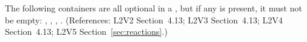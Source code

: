 The following containers are all optional in a \Reaction, but if any
is present, it must not be empty: ,
, , .
(References: L2V2 Section~4.13; L2V3 Section~4.13; L2V4 Section~4.13; L2V5 Section~\ref{sec:reactions}.)
